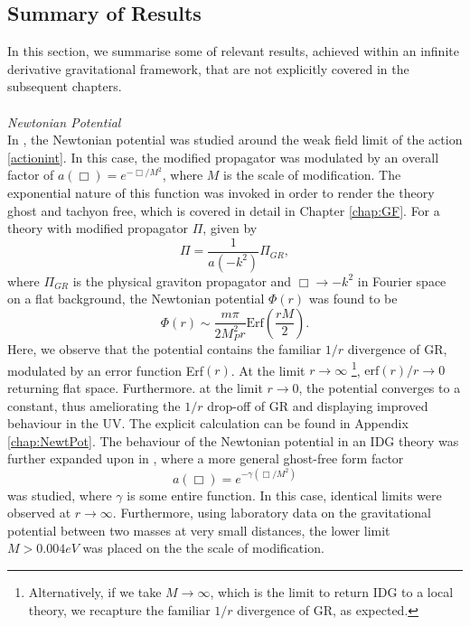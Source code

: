 \subsection*{Summary of Results}
In this section, we summarise some of relevant results, achieved within an infinite derivative gravitational framework, that are not explicitly covered in the subsequent chapters.\\\\
\emph{Newtonian Potential}\\
In \cite{Biswas:2011ar}, the Newtonian potential was studied around the weak field limit of the action \eqref{actionint}. In this case, the modified propagator was modulated by an overall factor of  $a(\Box)=e^{-\Box/M^2}$, where $M$ is the scale of modification. The exponential nature of this function was invoked in order to render the theory ghost and tachyon free, which is covered in detail in Chapter \ref{chap:GF}. For a theory with modified propagator $\Pi$, given by
\[
\Pi=\frac{1}{a(-k^2)}\Pi_{GR}
,\]
where $\Pi_{GR}$ is the physical graviton propagator and $\Box\rightarrow -k^2$ in Fourier space on a flat background, the Newtonian potential $\Phi(r)$ was found to be
\[
\label{erf}
\Phi(r)\sim\frac{m\pi}{2M_P^2 r}\mbox{Erf}(\frac{r M}{2})
.\]
Here, we observe that the potential contains the familiar $1/r$ divergence of GR, modulated by an error function Erf$(r)$. At the limit $r\rightarrow \infty$ \footnote{Alternatively, if we take $M\rightarrow\infty$, which is the limit to return IDG to a local theory, we recapture the familiar $1/r$ divergence of GR, as expected.}, $\mbox{erf}(r)/r\rightarrow 0$ returning flat space. Furthermore. at the limit $r\rightarrow 0$, the potential converges to a constant, thus ameliorating the $1/r$ drop-off of GR and displaying improved behaviour in the UV. The explicit calculation  can be found in Appendix \ref{chap:NewtPot}. The behaviour of the Newtonian potential in an IDG theory was further expanded upon in \cite{Edholm:2016hbt}, where a more general ghost-free form factor
\[
a(\Box)=e^{-\gamma(\Box/M^2)}
\]
was studied, where $\gamma$ is some entire function. In this case, identical limits were observed at $r\rightarrow \infty$. Furthermore, using laboratory data on the gravitational potential between two masses at very small distances, the lower limit $M>0.004eV$ was placed on the the scale of modification.
